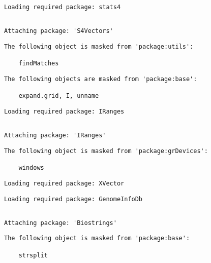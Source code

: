 \documentclass[
  letterpaper,
  DIV=11,
  numbers=noendperiod]{scrartcl}
\begin{document}
\begin{verbatim}
Loading required package: stats4
\end{verbatim}

\begin{verbatim}

Attaching package: 'S4Vectors'
\end{verbatim}

\begin{verbatim}
The following object is masked from 'package:utils':

    findMatches
\end{verbatim}

\begin{verbatim}
The following objects are masked from 'package:base':

    expand.grid, I, unname
\end{verbatim}

\begin{verbatim}
Loading required package: IRanges
\end{verbatim}

\begin{verbatim}

Attaching package: 'IRanges'
\end{verbatim}

\begin{verbatim}
The following object is masked from 'package:grDevices':

    windows
\end{verbatim}

\begin{verbatim}
Loading required package: XVector
\end{verbatim}

\begin{verbatim}
Loading required package: GenomeInfoDb
\end{verbatim}

\begin{verbatim}

Attaching package: 'Biostrings'
\end{verbatim}

\begin{verbatim}
The following object is masked from 'package:base':

    strsplit
\end{verbatim}
\end{document}
